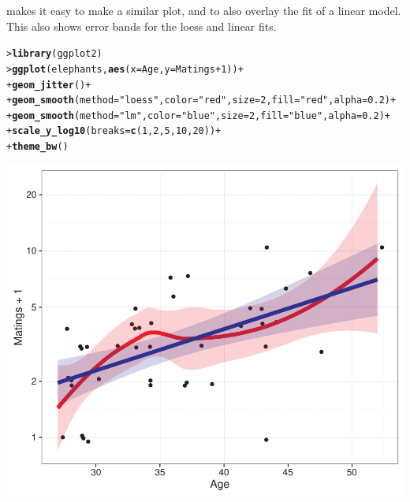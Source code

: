 \documentclass[10pt]{report}\usepackage[]{graphicx}\usepackage[]{color}
\makeatletter
\newcommand{\hlnum}[1]{\textcolor[rgb]{0.686,0.059,0.569}{#1}}%
\newcommand{\hlstr}[1]{\textcolor[rgb]{0.192,0.494,0.8}{#1}}%
\newcommand{\hlopt}[1]{\textcolor[rgb]{0,0,0}{#1}}%
\newcommand{\hlstd}[1]{\textcolor[rgb]{0.345,0.345,0.345}{#1}}%
\newcommand{\hlkwc}[1]{\textcolor[rgb]{0.333,0.667,0.333}{#1}}%
\newcommand{\hlkwd}[1]{\textcolor[rgb]{0.737,0.353,0.396}{\textbf{#1}}}%
\newenvironment{kframe}{%
 \def\at@end@of@kframe{}%
 \ifinner\ifhmode%
  \def\at@end@of@kframe{\end{minipage}}%
  \begin{minipage}{\columnwidth}%
 \fi\fi%
 \def\FrameCommand##1{\hskip\@totalleftmargin \hskip-\fboxsep
 \colorbox{shadecolor}{##1}\hskip-\fboxsep
     \hskip-\linewidth \hskip-\@totalleftmargin \hskip\columnwidth}%
 \MakeFramed {\advance\hsize-\width
   \@totalleftmargin\z@ \linewidth\hsize
   \@setminipage}}%
 {\par\unskip\endMakeFramed%
 \at@end@of@kframe}
\newenvironment{knitrout}{}{} %
\renewenvironment{knitrout}{\small\renewcommand{\baselinestretch}{.85}}{} %
\makeatother
\begin{document}
\begin{Exercises}
\begin{enumerate*}
\begin{ans}
\begin{knitrout}
\end{knitrout}
     makes it easy to make a similar plot, and to also overlay the fit of a linear model.
    This also shows error bands for the loess and linear fits. 
\begin{knitrout}\footnotesize
{}\color{fgcolor}\begin{kframe}
\begin{alltt}
\hlstd{> }\hlkwd{library}\hlstd{(ggplot2)}
\hlstd{> }\hlkwd{ggplot}\hlstd{(elephants,} \hlkwd{aes}\hlstd{(}\hlkwc{x}\hlstd{=Age,} \hlkwc{y}\hlstd{=Matings}\hlopt{+}\hlnum{1}\hlstd{))} \hlopt{+}
\hlstd{+ }  \hlkwd{geom_jitter}\hlstd{()} \hlopt{+}
\hlstd{+ }        \hlkwd{geom_smooth}\hlstd{(}\hlkwc{method}\hlstd{=}\hlstr{"loess"}\hlstd{,} \hlkwc{color}\hlstd{=}\hlstr{"red"}\hlstd{,} \hlkwc{size}\hlstd{=}\hlnum{2}\hlstd{,} \hlkwc{fill}\hlstd{=}\hlstr{"red"}\hlstd{,} \hlkwc{alpha}\hlstd{=}\hlnum{0.2}\hlstd{)} \hlopt{+}
\hlstd{+ }        \hlkwd{geom_smooth}\hlstd{(}\hlkwc{method}\hlstd{=}\hlstr{"lm"}\hlstd{,} \hlkwc{color}\hlstd{=}\hlstr{"blue"}\hlstd{,} \hlkwc{size}\hlstd{=}\hlnum{2}\hlstd{,} \hlkwc{fill}\hlstd{=}\hlstr{"blue"}\hlstd{,} \hlkwc{alpha}\hlstd{=}\hlnum{0.2}\hlstd{)} \hlopt{+}
\hlstd{+ }        \hlkwd{scale_y_log10}\hlstd{(}\hlkwc{breaks}\hlstd{=}\hlkwd{c}\hlstd{(}\hlnum{1}\hlstd{,}\hlnum{2}\hlstd{,}\hlnum{5}\hlstd{,}\hlnum{10}\hlstd{,} \hlnum{20}\hlstd{))} \hlopt{+}
\hlstd{+ }  \hlkwd{theme_bw}\hlstd{()}
\end{alltt}
\end{kframe}

\centerline{\includegraphics[width=.5\textwidth]{soln/fig/ex11_1b2-1} }



\end{knitrout}

    \end{ans}
    

\end{enumerate*}
\end{Exercises}
\end{document}
